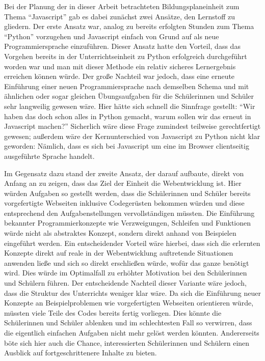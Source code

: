Bei der Planung der in dieser Arbeit betrachteten Bildungsplaneinheit zum Thema ``Javascript'' gab es dabei zunächst zwei Ansätze, den Lernstoff zu gliedern.
Der erste Ansatz war, analog zu bereits erfolgten Stunden zum Thema ``Python'' vorzugehen und Javascript einfach von Grund auf als neue Programmiersprache einzuführen.
Dieser Ansatz hatte den Vorteil, dass das Vorgehen bereits in der Unterrichtseinheit zu Python erfolgreich durchgeführt worden war und man mit dieser Methode ein relativ sicheres Lernergebnis erreichen können würde.
Der große Nachteil war jedoch, dass eine erneute Einführung einer neuen Programmiersprache nach demselben Schema und mit ähnlichen oder sogar gleichen Übungsaufgaben für die Schülerinnen und Schüler sehr langweilig gewesen wäre.
Hier hätte sich schnell die Sinnfrage gestellt: ``Wir haben das doch schon alles in Python gemacht, warum sollen wir das erneut in Javascript machen?''
Sicherlich wäre diese Frage zumindest teilweise gerechtfertigt gewesen; außerdem wäre der Kernunterschied von Javascript zu Python nicht klar geworden:
Nämlich, dass es sich bei Javascript um eine im Browser clientseitig ausgeführte Sprache handelt.

Im Gegensatz dazu stand der zweite Ansatz, der darauf aufbaute, direkt von Anfang an zu zeigen, dass das Ziel der Einheit die Webentwicklung ist.
Hier würden Aufgaben so gestellt werden, dass die Schülerinnen und Schüler bereits vorgefertigte Webseiten inklusive Codegerüsten bekommen würden und diese entsprechend den Aufgabenstellungen vervollständigen müssten.
Die Einführung bekannter Programmierkonzepte wie Verzweigungen, Schleifen und Funktionen würde nicht als abstraktes Konzept, sondern direkt anhand von Beispielen eingeführt werden.
Ein entscheidender Vorteil wäre hierbei, dass sich die erlernten Konzepte direkt auf reale in der Webentwicklung auftretende Situationen anwenden ließe und sich so direkt erschließen würde, wofür das ganze benötigt wird.
Dies würde im Optimalfall zu erhöhter Motivation bei den Schülerinnen und Schülern führen.
Der entscheidende Nachteil dieser Variante wäre jedoch, dass die Struktur des Unterrichts weniger klar wäre.
Da sich die Einführung neuer Konzepte an Beispielproblemen wie vorgefertigten Webseiten orientieren würde, müssten viele Teile des Codes bereits fertig vorliegen.
Dies könnte die Schülerinnen und Schüler ablenken und im schlechtesten Fall so verwirren, dass die eigentlich einfachen Aufgaben nicht mehr gelöst werden könnten.
Andererseits böte sich hier auch die Chance, interessierten Schülerinnen und Schülern einen Ausblick auf fortgeschrittenere Inhalte zu bieten.


